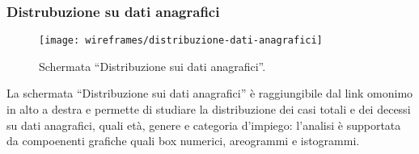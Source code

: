 \documentclass[../../../main.tex]{subfiles}
\begin{document}
\subsubsection{Distrubuzione su dati anagrafici}\label{ss:distribuzione-su-dati-anagrafici}
\begin{figure}[H]
    \centering
    \texttt{[image: wireframes/distribuzione-dati-anagrafici]}
    \caption{Schermata ``Distribuzione sui dati anagrafici''.}
    \label{fig:distribuzione-dati-anagrafici}
\end{figure}
La schermata ``Distribuzione sui dati anagrafici'' è raggiungibile dal link omonimo in alto a destra e permette di studiare la distribuzione dei casi totali e dei decessi su dati anagrafici, quali età, genere e categoria d'impiego: l'analisi è supportata da compoenenti grafiche quali box numerici, areogrammi e istogrammi.
\end{document}
